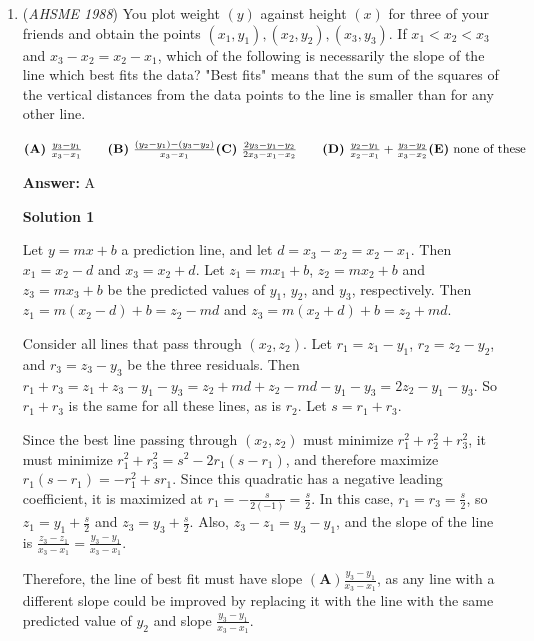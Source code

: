 \begin{enumerate}
 


 


	\item (\textit{AHSME 1988}) You plot weight $(y)$ against height $(x)$ for three of your friends and obtain the points 
$(x_{1},y_{1}), (x_{2},y_{2}), (x_{3},y_{3})$. If $x_{1} < x_{2} < x_{3}$ and $x_{3} - x_{2} = x_{2} - x_{1}$, 
which of the following is necessarily the slope of the line which best fits the data? 
"Best fits" means that the sum of the squares of the vertical distances from the data points to the line is smaller than for any other line.


 $\textbf{(A)}\ \frac{y_{3}-y_{1}}{x_{3}-x_{1}}\qquad \textbf{(B)}\ \frac{(y_{2}-y_{1})-(y_{3}-y_{2})}{x_{3}-x_{1}}\qquad\\ \textbf{(C)}\ \frac{2y_{3}-y_{1}-y_{2}}{2x_{3}-x_{1}-x_{2}}\qquad \textbf{(D)}\ \frac{y_{2}-y_{1}}{x_{2}-x_{1}}+\frac{y_{3}-y_{2}}{x_{3}-x_{2}}\qquad\\ \textbf{(E)}\ \text{none of these}$

 \textbf{Answer: }A



\textbf{Solution 1}

Let $y = mx + b$ a prediction line, and let $d = x_3 - x_2 = x_2 - x_1$.  Then $x_1 = x_2 - d$ and $x_3 = x_2 + d$.  Let $z_1 = mx_1 + b$, $z_2 = mx_2 + b$ and $z_3 = mx_3 + b$ be the predicted values of $y_1$, $y_2$, and $y_3$, respectively.  Then $z_1 = m(x_2 - d) + b = z_2 - md$ and $z_3 = m(x_2 + d) + b = z_2 + md$.

 Consider all lines that pass through $(x_2, z_2)$.  Let $r_1 = z_1 - y_1$, $r_2 = z_2 - y_2$, and $r_3 = z_3 - y_3$ be the three residuals.  Then $r_1 + r_3 = z_1 + z_3 - y_1 - y_3 = z_2 + md + z_2 - md - y_1 - y_3 = 2z_2 - y_1 - y_3$.  So $r_1 + r_3$ is the same for all these lines, as is $r_2$.  Let $s = r_1 + r_3$.  

 Since the best line passing through $(x_2, z_2)$ must minimize $r_1^2 + r_2^2 + r_3^2$, it must minimize $r_1^2 + r_3^2 = s^2 - 2r_1(s - r_1)$, and therefore maximize $r_1(s - r_1) = -r_1^2 + sr_1$.  Since this quadratic has a negative leading coefficient, it is maximized at $r_1 = -\frac{s}{2(-1)} = \frac{s}{2}$.  In this case, $r_1 = r_3 = \frac{s}{2}$, so $z_1 = y_1 + \frac{s}{2}$ and $z_3 = y_3 + \frac{s}{2}$.  Also, $z_3 - z_1 = y_3 - y_1$, and the slope of the line is $\frac{z_3 - z_1}{x_3 - x_1} = \frac{y_3 - y_1}{x_3 - x_1}$.

 Therefore, the line of best fit must have slope $\boxed{(\textbf{A}) \frac{y_3 - y_1}{x_3 - x_1}}$, as any line with a different slope could be improved by replacing it with the line with the same predicted value of $y_2$ and slope $\frac{y_3 - y_1}{x_3 - x_1}$.  


\end{enumerate}

